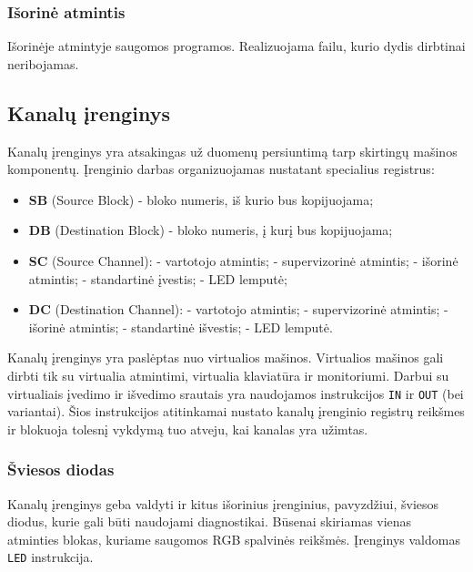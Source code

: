 \documentclass{scrartcl}
\begin{document}
            \subsubsection{Išorinė atmintis}
                Išorinėje atmintyje saugomos programos. Realizuojama failu, kurio dydis dirbtinai neribojamas.
        \subsection{Kanalų įrenginys}
            Kanalų įrenginys yra atsakingas už duomenų persiuntimą tarp skirtingų mašinos komponentų. Įrenginio darbas organizuojamas nustatant specialius registrus:
            \begin{itemize}
                \item \textbf{SB} (Source Block) - bloko numeris, iš kurio bus kopijuojama;
                \item \textbf{DB} (Destination Block) - bloko numeris, į kurį bus kopijuojama;
                \item \textbf{SC} (Source Channel):
                     - vartotojo atmintis;
                     - supervizorinė atmintis;
                     - išorinė atmintis;
                     - standartinė įvestis;
                     - LED lemputė;
                \item \textbf{DC} (Destination Channel):
                     - vartotojo atmintis;
                     - supervizorinė atmintis;
                     - išorinė atmintis;
                     - standartinė išvestis;
                     - LED lemputė.
            \end{itemize}
            Kanalų įrenginys yra paslėptas nuo virtualios mašinos. Virtualios mašinos gali dirbti tik su virtualia atmintimi, virtualia klaviatūra ir monitoriumi. Darbui su virtualiais įvedimo ir išvedimo srautais yra naudojamos instrukcijos \texttt{IN} ir \texttt{OUT} (bei variantai). Šios instrukcijos atitinkamai nustato kanalų įrenginio registrų reikšmes ir blokuoja tolesnį vykdymą tuo atveju, kai kanalas yra užimtas.
            \subsubsection{Šviesos diodas}
                Kanalų įrenginys geba valdyti ir kitus išorinius įrenginius, pavyzdžiui, šviesos diodus, kurie gali būti naudojami diagnostikai. Būsenai skiriamas vienas atminties blokas, kuriame saugomos RGB spalvinės reikšmės. Įrenginys valdomas \texttt{LED} instrukcija.
    \pagebreak
\end{document}
